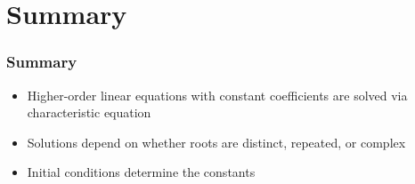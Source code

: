 \section{Summary}

\begin{frame}
    \frametitle{Summary}
    
    \begin{itemize}
        \item Higher-order linear equations with constant coefficients are solved via characteristic equation
        \item Solutions depend on whether roots are distinct, repeated, or complex
        \item Initial conditions determine the constants
    \end{itemize}
\end{frame}


